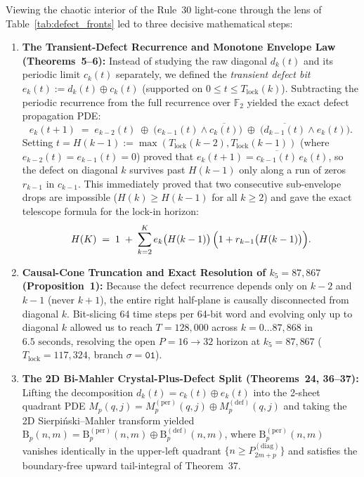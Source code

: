 \documentclass[11pt,a4paper]{article}
\theoremstyle{definition}
\theoremstyle{remark}
\newcommand{\Ftwo}{\mathbb{F}_2}
\begin{document}
Viewing the chaotic interior of the Rule~30 light-cone through the lens of Table~\ref{tab:defect_fronts} led to three decisive mathematical steps:
\begin{enumerate}
  \item \textbf{The Transient-Defect Recurrence and Monotone Envelope Law (Theorems~5--6):} Instead of studying the raw diagonal $d_k(t)$ and its periodic limit $c_k(t)$ separately, we defined the \emph{transient defect bit} $e_k(t) := d_k(t) \oplus c_k(t)$ (supported on $0 \le t \le T_{\mathrm{lock}}(k)$). Subtracting the periodic recurrence from the full recurrence over $\Ftwo$ yielded the exact defect propagation PDE:
  \begin{equation}
    e_k(t+1) \;=\; e_{k-2}(t) \;\oplus\; \bigl(e_{k-1}(t) \land \overline{c_k(t)}\bigr) \;\oplus\; \bigl(\overline{d_{k-1}(t)} \land e_k(t)\bigr).
  \end{equation}
  Setting $t = H(k-1) := \max(T_{\mathrm{lock}}(k-2), T_{\mathrm{lock}}(k-1))$ (where $e_{k-2}(t) = e_{k-1}(t) = 0$) proved that $e_k(t+1) = \overline{c_{k-1}(t)}\,e_k(t)$, so the defect on diagonal $k$ survives past $H(k-1)$ only along a run of zeros $r_{k-1}$ in $c_{k-1}$. This immediately proved that two consecutive sub-envelope drops are impossible ($H(k) \ge H(k-1)$ for all $k \ge 2$) and gave the exact telescope formula for the lock-in horizon:
  \begin{equation}
    H(K) \;=\; 1 \;+\; \sum_{k=2}^K e_k\bigl(H(k-1)\bigr)\,\Bigl(1 + r_{k-1}\bigl(H(k-1)\bigr)\Bigr).
  \end{equation}
  \item \textbf{Causal-Cone Truncation and Exact Resolution of $k_5 = 87{,}867$ (Proposition~1):} Because the defect recurrence depends only on $k-2$ and $k-1$ (never $k+1$), the entire right half-plane is causally disconnected from diagonal $k$. Bit-slicing 64 time steps per 64-bit word and evolving only up to diagonal $k$ allowed us to reach $T = 128{,}000$ across $k = 0 \dots 87{,}868$ in $6.5\text{ seconds}$, resolving the open $P = 16 \to 32$ horizon at \textbf{$k_5 = 87{,}867$} ($T_{\mathrm{lock}} = 117{,}324$, branch $\sigma = \mathtt{01}$).
  \item \textbf{The 2D Bi-Mahler Crystal-Plus-Defect Split (Theorems~24, 36--37):} Lifting the decomposition $d_k(t) = c_k(t) \oplus e_k(t)$ into the 2-sheet quadrant PDE $M_p(q,j) = M_p^{(\mathrm{per})}(q,j) \oplus M_p^{(\mathrm{def})}(q,j)$ and taking the 2D Sierpi\'nski--Mahler transform yielded $\mathrm{B}_p(n,m) = \mathrm{B}_p^{(\mathrm{per})}(n,m) \oplus \mathrm{B}_p^{(\mathrm{def})}(n,m)$, where $\mathrm{B}_p^{(\mathrm{per})}(n,m)$ vanishes identically in the upper-left quadrant $\{n \ge P_{2m+p}^{(\mathrm{diag})}\}$ and satisfies the boundary-free upward tail-integral of Theorem~37.
\end{enumerate}
\end{document}
